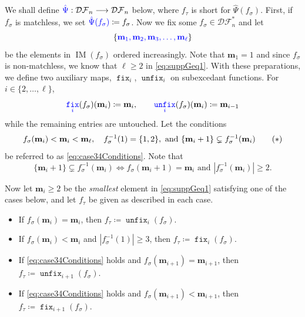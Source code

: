 \documentclass[reqno]{amsart}
\theoremstyle{definition}
\newcommand{\defin}[1]{%
\relax\ifmmode%
\textcolor{blue}{#1}%
\else\textcolor{blue}{\emph{#1}}%
\fi%
}
\newcommand{\DSEF}{\mathcal{DF}}%
\newcommand{\fretherD}{\hat{\Psi}}
\newcommand{\caseOne}{\ensuremath{\heartsuit}}
\newcommand{\caseTwo}{\ensuremath{\spadesuit}}
\newcommand{\caseThree}{\ensuremath{\diamondsuit}}
\newcommand{\caseFour}{\ensuremath{\clubsuit}}
\newcommand{\img}{\mathbf{m}}
\DeclareMathOperator{\supp}{IM}
\DeclareMathOperator{\fixMap}{\mathtt{fix}}
\DeclareMathOperator{\unfixMap}{\mathtt{unfix}}
\begin{document}
\bigskip 

We shall define $\defin{\fretherD}:\DSEF_n \longrightarrow \DSEF_n$ below,
where $f_{\tau}$ is short for $\fretherD(f_{\sigma})$.
First, if $f_\sigma$ is matchless, we set $\defin{\fretherD(f_\sigma)}\coloneqq f_\sigma$.
%
Now we fix some $f_{\sigma}\in \DSEF^*_n$ and 
let 
\begin{equation}\label{eq:suppGeq1}
  \{\defin{ \img_1, \img_2, \img_3, \dotsc, \img_{\ell} } \}
\end{equation}
be the elements in $\supp(f_{\sigma})$
ordered increasingly. Note that $\img_1=1$ and  since $f_\sigma$ is non-matchless,
we know that $\ell \geq 2$ in \eqref{eq:suppGeq1}.
%
With these preparations, we define two auxiliary maps, 
$\fixMap_i$, $\unfixMap_i$ on subexcedant functions.
For $i \in \{2,\dotsc,\ell\}$,
\begin{equation}\label{eq:auxmaps}
   \defin{\fixMap_i}(f_\sigma)(\img_i) \coloneqq \img_i, \qquad 
   \defin{\unfixMap_i}(f_\sigma)(\img_{i}) \coloneqq\img_{i-1}
\end{equation}
while the remaining entries are untouched.
%
Let the conditions
\begin{equation}\label{eq:case34Conditions}
\begin{aligned}
  f_{\sigma}(\img_i) < \img_i < \img_\ell,\quad
  f^{-1}_\sigma(1) = \{1,2\}, \text{ and }
  \{\img_i + 1\}\subsetneq f^{-1}_\sigma(\img_i)
\end{aligned} \tag{\text{$\ast$}}
\end{equation}
be referred to as \eqref{eq:case34Conditions}.
Note that 
\[
  \{\img_i + 1\}\subsetneq f^{-1}_\sigma(\img_i) \iff 
  f_\sigma(\img_i + 1) = \img_i \text{ and } |f^{-1}_\sigma(\img_i)| \geq 2.
\]

\medskip 

Now let $\img_i \geq 2$ be the \emph{smallest} element
in \eqref{eq:suppGeq1} satisfying one of the cases below,
and let $f_\tau$ be given as described in each case.
%
%
\begin{itemize}[leftmargin=2cm]
 \item[\textbf{Case \caseOne:}] If $f_{\sigma}(\img_i) = \img_i$,
	then $f_\tau \coloneqq \unfixMap_i(f_\sigma)$.

 \item[\textbf{Case \caseTwo:}] If $f_{\sigma}(\img_i) < \img_i$ and $|f^{-1}_\sigma(1)| \geq 3$,
 then $f_\tau \coloneqq \fixMap_i(f_\sigma)$.
 
 \item[\textbf{Case \caseThree:}] \label{case3a} 
If \eqref{eq:case34Conditions} holds and $f_\sigma(\img_{i+1}) = \img_{i+1}$, then
$
 f_\tau \coloneqq \unfixMap_{i+1}(f_\sigma).
$

\item[\textbf{Case \caseFour:}] \label{case4} 
If \eqref{eq:case34Conditions} holds and $f_\sigma(\img_{i+1}) < \img_{i+1}$, then
$
 f_\tau \coloneqq \fixMap_{i+1}(f_\sigma).
$
\end{itemize}
\end{document}
